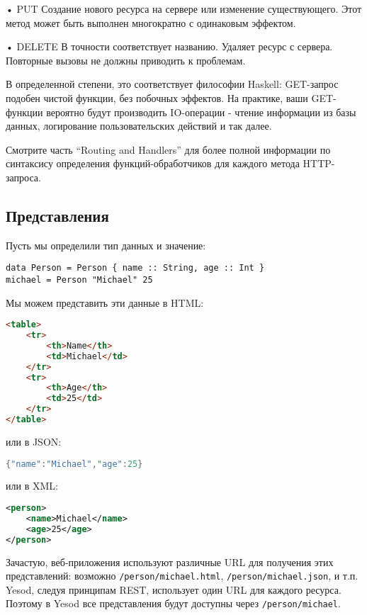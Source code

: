 • PUT
Создание нового ресурса на сервере или изменение существующего. Этот метод может быть выполнен многократно с одинаковым эффектом.

• DELETE
В точности соответствует названию. Удаляет ресурс с сервера. Повторные вызовы не должны приводить к проблемам.

В определенной степени, это соответствует философии Haskell: GET-запрос подобен чистой функции, без побочных эффектов. На практике, ваши GET-функции вероятно будут производить IO-операции - чтение информации из базы данных, логирование пользовательских действий и так далее.

Смотрите часть “Routing and Handlers” для более полной информации по синтаксису определения функций-обработчиков для каждого метода HTTP-запроса.

\subsection{Представления}

Пусть мы определили тип данных и значение:

\begin{lstlisting}
data Person = Person { name :: String, age :: Int }
michael = Person "Michael" 25
\end{lstlisting}

Мы можем представить эти данные в HTML:
\begin{lstlisting}[language=HTML]
 <table>
    <tr>
        <th>Name</th>
        <td>Michael</td>
    </tr>
    <tr>
        <th>Age</th>
        <td>25</td>
    </tr>
</table>
\end{lstlisting}

или в JSON:

\begin{lstlisting}[language=Java]
{"name":"Michael","age":25}
\end{lstlisting}

или в XML:
\begin{lstlisting}[language=XML]
<person>
    <name>Michael</name>
    <age>25</age>
</person>
\end{lstlisting}

Зачастую, веб-приложения используют различные URL для получения этих представлений: возможно \lstinline '/person/michael.html', \lstinline '/person/michael.json', и т.п. Yesod, следуя принципам REST, использует один URL для каждого ресурса. Поэтому в Yesod все представления будут доступны через \lstinline '/person/michael'.

